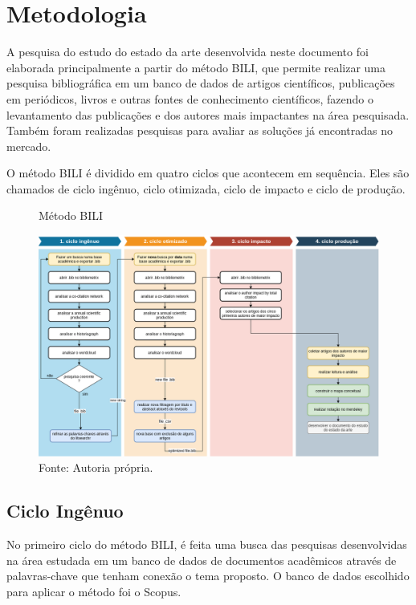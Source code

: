 \chapter{Metodologia}
\label{chap:metodologia}
A pesquisa do estudo do estado da arte desenvolvida neste documento foi elaborada principalmente a partir do método BILI, que permite realizar uma pesquisa bibliográfica em um banco de dados de artigos científicos, publicações em periódicos, livros e outras fontes de conhecimento científicos, fazendo o levantamento das publicações e dos autores mais impactantes na área pesquisada. Também foram realizadas pesquisas para avaliar as soluções já encontradas no mercado.

O método BILI é dividido em quatro ciclos que acontecem em sequência. Eles são chamados de ciclo ingênuo, ciclo otimizada, ciclo de impacto e ciclo de produção.



\begin{figure} [h!]	
  \centering
  \caption{Método BILI}
  \includegraphics[width=1\textwidth]{Figures/bili.png}
  \caption*{Fonte: Autoria própria.}
  \label{fig:QFD}
\end{figure}

\section{Ciclo Ingênuo}
No primeiro ciclo do método BILI, é feita uma busca das pesquisas desenvolvidas na área estudada em um banco de dados de documentos acadêmicos através de palavras-chave que tenham conexão o tema proposto. O banco de dados escolhido para aplicar o método foi o Scopus.

